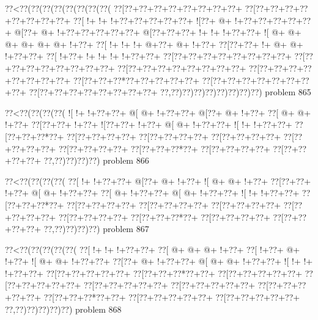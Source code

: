 \vbox{\vbox{\goo
\0??<\0??(\0??(\0??(\0??(\0??(\0??(\0??(\0??(
\0??[\0??+\0??+\0??+\0??+\0??+\0??+\0??+\0??+
\0??[\0??+\0??+\0??+\0??+\0??+\0??+\0??+\0??+
\0??[\- !+\- !+\- !+\0??+\0??+\0??+\0??+\0??+
\- ![\0??+\- @+\- !+\0??+\0??+\0??+\0??+\0??+
\- @[\0??+\- @+\- !+\0??+\0??+\0??+\0??+\0??+
\- @[\0??+\0??+\0??+\- !+\- !+\- !+\0??+\0??+
\- ![\- @+\- @+\- @+\- @+\- @+\- @+\- !+\0??+
\0??[\- !+\- !+\- !+\- @+\0??+\- @+\- !+\0??+
\0??[\0??+\0??+\- !+\- @+\- @+\- !+\0??+\0??+
\0??[\- !+\0??+\- !+\- !+\- !+\- !+\0??+\0??+
\0??[\0??+\0??+\0??+\0??+\0??+\0??+\0??+\0??+
\0??[\0??+\0??+\0??+\0??+\0??+\0??+\0??+\0??+
\0??[\0??+\0??+\0??+\0??+\0??+\0??+\0??+\0??+
\0??[\0??+\0??+\0??+\0??+\0??+\0??+\0??+\0??+
\0??[\0??+\0??+\0??*\0??+\0??+\0??+\0??+\0??+
\0??[\0??+\0??+\0??+\0??+\0??+\0??+\0??+\0??+
\0??[\0??+\0??+\0??+\0??+\0??+\0??+\0??+\0??+
\0??,\0??)\0??)\0??)\0??)\0??)\0??)\0??)\0??)
}
\hfil problem 865\hfil\break
}

\vbox{\vbox{\goo
\0??<\0??(\0??(\0??(\0??(
\- ![\- !+\- !+\0??+\0??+
\- @[\- @+\- !+\0??+\0??+
\- @[\0??+\- @+\- !+\0??+
\0??[\- @+\- @+\- !+\0??+
\0??[\0??+\0??+\- !+\0??+
\- ![\0??+\0??+\- !+\0??+
\- @[\- @+\- !+\0??+\0??+
\- ![\- !+\- !+\0??+\0??+
\0??[\0??+\0??+\0??*\0??+
\0??[\0??+\0??+\0??+\0??+
\0??[\0??+\0??+\0??+\0??+
\0??[\0??+\0??+\0??+\0??+
\0??[\0??+\0??+\0??+\0??+
\0??[\0??+\0??+\0??+\0??+
\0??[\0??+\0??+\0??*\0??+
\0??[\0??+\0??+\0??+\0??+
\0??[\0??+\0??+\0??+\0??+
\0??,\0??)\0??)\0??)\0??)
}
\hfil problem 866\hfil\break
}

\vbox{\vbox{\goo
\0??<\0??(\0??(\0??(\0??(
\0??[\- !+\- !+\0??+\0??+
\- @[\0??+\- @+\- !+\0??+
\- ![\- @+\- @+\- !+\0??+
\0??[\0??+\0??+\- !+\0??+
\- @[\- @+\- !+\0??+\0??+
\0??[\- @+\- !+\0??+\0??+
\- @[\- @+\- !+\0??+\0??+
\- ![\- !+\- !+\0??+\0??+
\0??[\0??+\0??+\0??*\0??+
\0??[\0??+\0??+\0??+\0??+
\0??[\0??+\0??+\0??+\0??+
\0??[\0??+\0??+\0??+\0??+
\0??[\0??+\0??+\0??+\0??+
\0??[\0??+\0??+\0??+\0??+
\0??[\0??+\0??+\0??*\0??+
\0??[\0??+\0??+\0??+\0??+
\0??[\0??+\0??+\0??+\0??+
\0??,\0??)\0??)\0??)\0??)
}
\hfil problem 867\hfil\break
}

\vbox{\vbox{\goo
\0??<\0??(\0??(\0??(\0??(\0??(
\0??[\- !+\- !+\- !+\0??+\0??+
\0??[\- @+\- @+\- @+\- !+\0??+
\0??[\- !+\0??+\- @+\- !+\0??+
\- ![\- @+\- @+\- !+\0??+\0??+
\0??[\0??+\- @+\- !+\0??+\0??+
\- @[\- @+\- @+\- !+\0??+\0??+
\- ![\- !+\- !+\- !+\0??+\0??+
\0??[\0??+\0??+\0??+\0??+\0??+
\0??[\0??+\0??+\0??*\0??+\0??+
\0??[\0??+\0??+\0??+\0??+\0??+
\0??[\0??+\0??+\0??+\0??+\0??+
\0??[\0??+\0??+\0??+\0??+\0??+
\0??[\0??+\0??+\0??+\0??+\0??+
\0??[\0??+\0??+\0??+\0??+\0??+
\0??[\0??+\0??+\0??*\0??+\0??+
\0??[\0??+\0??+\0??+\0??+\0??+
\0??[\0??+\0??+\0??+\0??+\0??+
\0??,\0??)\0??)\0??)\0??)\0??)
}
\hfil problem 868\hfil\break
}

